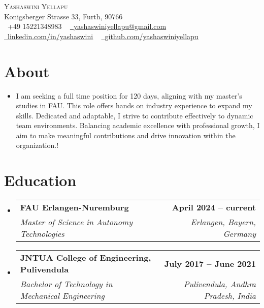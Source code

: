 \documentclass[letterpaper,11pt]{article}
\makeatletter
\newcommand{\resumeItem}[1]{
  \item\small{
    {#1 \vspace{-2pt}}
  }
}
\newcommand{\resumeSubheading}[4]{
  \vspace{-2pt}\item
    \begin{tabular*}{1.0\textwidth}[t]{l@{\extracolsep{\fill}}r}
      \textbf{#1} & \textbf{\small #2} \\
      \textit{\small#3} & \textit{\small #4} \\
    \end{tabular*}\vspace{-7pt}
}
\newcommand{\resumeSubHeadingListStart}{\begin{itemize}[leftmargin=0.0in, label={}]}
\newcommand{\resumeSubHeadingListEnd}{\end{itemize}}
\makeatother
\begin{document}

\begin{center}
  {\Huge \scshape Yashaswini Yellapu} \\ \vspace{1pt}
  Konigsberger Strasse 33, Furth, 90766 \\ \vspace{1pt}
  \small \raisebox{-0.1\height}\faPhone\ +49 15221348983 ~ \href{mailto:yashaswiniyellapu@gmail.com}{\raisebox{-0.2\height}\faEnvelope\  \underline{yashaswiniyellapu@gmail.com}} ~
  \href{https://www.linkedin.com/in/yashaswini-y-200500149/}{\raisebox{-0.2\height}\faLinkedin\ \underline{linkedin.com/in/yashaswini}}  ~
  \href{https://github.com/yashaswiniyellapu}{\raisebox{-0.2\height}\faGithub\ \underline{github.com/yashaswiniyellapu}}
  \vspace{-8pt}
\end{center}

\section{About}
\resumeSubHeadingListStart
\resumeItem{I am seeking a full time position for 120 days, aligning with my master's studies in FAU. This role offers hands
  on industry experience to expand my skills. Dedicated and adaptable, I strive to contribute effectively to
  dynamic team environments. Balancing academic excellence with professional growth, I aim to make
  meaningful contributions and drive innovation within the organization.!}
\resumeSubHeadingListEnd
\vspace{-16pt}

\section{Education}
\resumeSubHeadingListStart
\resumeSubheading
{FAU Erlangen-Nuremburg}{April 2024 -- current}
{Master of Science in Autonomy Technologies}{Erlangen, Bayern, Germany}
\resumeSubheading
{JNTUA College of Engineering, Pulivendula}{July 2017 -- June 2021}
{Bachelor of Technology in Mechanical Engineering}{Pulivendula, Andhra Pradesh, India}
\resumeSubHeadingListEnd
\end{document}

